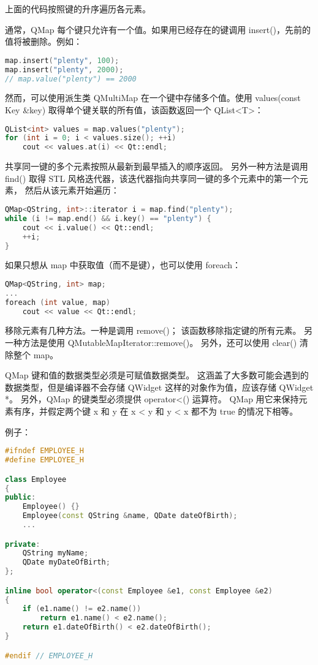 上面的代码按照键的升序遍历各元素。

通常，QMap 每个键只允许有一个值。如果用已经存在的键调用 insert()，先前的值将被删除。例如：

\begin{lstlisting}[language=C++]
map.insert("plenty", 100);
map.insert("plenty", 2000);
// map.value("plenty") == 2000
\end{lstlisting}

然而，可以使用派生类 QMultiMap 在一个键中存储多个值。使用 values(const Key \&key) 取得单个键关联的所有值，该函数返回一个 QList<T>：

\begin{lstlisting}[language=C++]
QList<int> values = map.values("plenty");
for (int i = 0; i < values.size(); ++i)
    cout << values.at(i) << Qt::endl;
\end{lstlisting}

共享同一键的多个元素按照从最新到最早插入的顺序返回。
另外一种方法是调用 find() 取得 STL 风格迭代器，该迭代器指向共享同一键的多个元素中的第一个元素，
然后从该元素开始遍历：

\begin{lstlisting}[language=C++]
QMap<QString, int>::iterator i = map.find("plenty");
while (i != map.end() && i.key() == "plenty") {
    cout << i.value() << Qt::endl;
    ++i;
}
\end{lstlisting}

如果只想从 map 中获取值（而不是键），也可以使用 foreach：

\begin{lstlisting}[language=C++]
QMap<QString, int> map;
...
foreach (int value, map)
    cout << value << Qt::endl;
\end{lstlisting}

移除元素有几种方法。一种是调用 remove()；
该函数移除指定键的所有元素。
另一种方法是使用 QMutableMapIterator::remove()。
另外，还可以使用 clear() 清除整个 map。

QMap 键和值的数据类型必须是可赋值数据类型。
这涵盖了大多数可能会遇到的数据类型，但是编译器不会存储 QWidget 这样的对象作为值，应该存储 QWidget *。
另外，QMap 的键类型必须提供 operator<() 运算符。
QMap 用它来保持元素有序，并假定两个键 x 和 y 在 x < y 和 y < x 都不为 true 的情况下相等。

例子：

\begin{lstlisting}[language=C++]
#ifndef EMPLOYEE_H
#define EMPLOYEE_H

class Employee
{
public:
    Employee() {}
    Employee(const QString &name, QDate dateOfBirth);
    ...

private:
    QString myName;
    QDate myDateOfBirth;
};

inline bool operator<(const Employee &e1, const Employee &e2)
{
    if (e1.name() != e2.name())
        return e1.name() < e2.name();
    return e1.dateOfBirth() < e2.dateOfBirth();
}

#endif // EMPLOYEE_H
\end{lstlisting}

